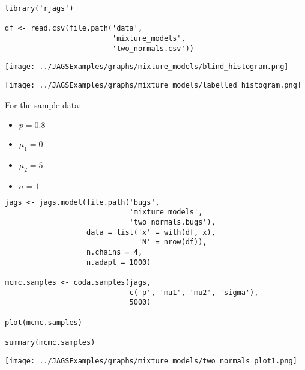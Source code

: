 \documentclass{beamer}
\begin{document}
\begin{frame}[fragile]
  \begin{verbatim}
library('rjags')

df <- read.csv(file.path('data',
                         'mixture_models',
                         'two_normals.csv'))
  \end{verbatim}
\end{frame}

\begin{frame}[fragile]
  \begin{center}
    \texttt{[image: ../JAGSExamples/graphs/mixture\_models/blind\_histogram.png]}
  \end{center}
\end{frame}

\begin{frame}[fragile]
  \begin{center}
    \texttt{[image: ../JAGSExamples/graphs/mixture\_models/labelled\_histogram.png]}
  \end{center}
\end{frame}

\begin{frame}[fragile]
For the sample data:
  \begin{itemize}
    \item{$p = 0.8$}
    \item{$\mu_1 = 0$}
    \item{$\mu_2 = 5$}
    \item{$\sigma = 1$}
  \end{itemize}
\end{frame}

\begin{frame}[fragile]
  \begin{verbatim}
jags <- jags.model(file.path('bugs',
                             'mixture_models',
                             'two_normals.bugs'),
                   data = list('x' = with(df, x),
                               'N' = nrow(df)),
                   n.chains = 4,
                   n.adapt = 1000)
 
mcmc.samples <- coda.samples(jags,
                             c('p', 'mu1', 'mu2', 'sigma'),
                             5000)

plot(mcmc.samples)

summary(mcmc.samples)
  \end{verbatim}
\end{frame}

\begin{frame}[fragile]
  \begin{center}
    \texttt{[image: ../JAGSExamples/graphs/mixture\_models/two\_normals\_plot1.png]}
  \end{center}
\end{frame}
\end{document}
